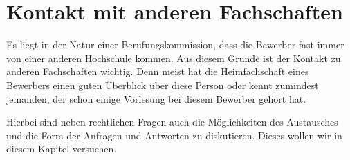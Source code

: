 \chapter{Kontakt mit anderen Fachschaften}\thispagestyle{fancy}
Es liegt in der Natur einer Berufungskommission, dass die Bewerber fast immer von einer anderen Hochschule kommen. Aus diesem Grunde ist der Kontakt zu anderen Fachschaften wichtig. Denn meist hat die Heimfachschaft eines Bewerbers einen guten Überblick über diese Person oder kennt zumindest jemanden, der schon einige Vorlesung bei diesem Bewerber gehört hat.

Hierbei sind neben rechtlichen Fragen auch die Möglichkeiten des Austausches und die Form der Anfragen und Antworten zu diskutieren. Dieses wollen wir in diesem Kapitel versuchen.





